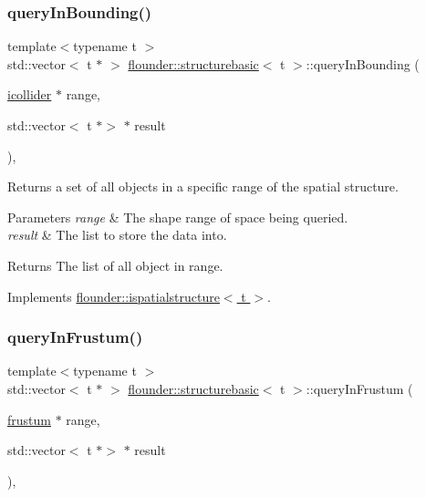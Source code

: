 \subsubsection{\texorpdfstring{query\+In\+Bounding()}{queryInBounding()}}
{\footnotesize\ttfamily template$<$typename t $>$ \\
std\+::vector$<$ t $\ast$ $>$ \hyperlink{classflounder_1_1structurebasic}{flounder\+::structurebasic}$<$ t $>$\+::query\+In\+Bounding (\begin{DoxyParamCaption}\item[{\hyperlink{classflounder_1_1icollider}{icollider} $\ast$}]{range,  }\item[{std\+::vector$<$ t $\ast$$>$ $\ast$}]{result }\end{DoxyParamCaption})\hspace{0.3cm}{\ttfamily [override]}, {\ttfamily [virtual]}}



Returns a set of all objects in a specific range of the spatial structure. 


\begin{DoxyParams}{Parameters}
{\em range} & The shape range of space being queried. \\
\hline
{\em result} & The list to store the data into. \\
\hline
\end{DoxyParams}
\begin{DoxyReturn}{Returns}
The list of all object in range. 
\end{DoxyReturn}


Implements \hyperlink{classflounder_1_1ispatialstructure_af170238d021510abf93e9dabbc5fad10}{flounder\+::ispatialstructure$<$ t $>$}.

\mbox{\label{classflounder_1_1structurebasic_ae53d9ef72c5dfb9bfee6012e51c32d95}} 
\subsubsection{\texorpdfstring{query\+In\+Frustum()}{queryInFrustum()}}
{\footnotesize\ttfamily template$<$typename t $>$ \\
std\+::vector$<$ t $\ast$ $>$ \hyperlink{classflounder_1_1structurebasic}{flounder\+::structurebasic}$<$ t $>$\+::query\+In\+Frustum (\begin{DoxyParamCaption}\item[{\hyperlink{classflounder_1_1frustum}{frustum} $\ast$}]{range,  }\item[{std\+::vector$<$ t $\ast$$>$ $\ast$}]{result }\end{DoxyParamCaption})\hspace{0.3cm}{\ttfamily [override]}, {\ttfamily [virtual]}}



